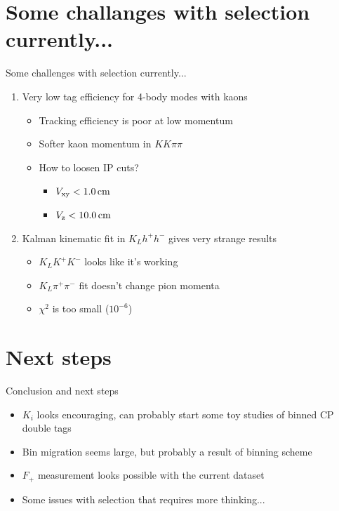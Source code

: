 \documentclass{beamer}
\begin{document}
\section{Some challanges with selection currently...}
\begin{frame}{Some challenges with selection currently...}
  \begin{enumerate}
    \setlength\itemsep{1.5em}
    \item{Very low tag efficiency for 4-body modes with kaons}
    \begin{itemize}
      \setlength\itemsep{1.0em}
      \item{Tracking efficiency is poor at low momentum}
      \item{Softer kaon momentum in $KK\pi\pi$}
      \item{How to loosen IP cuts?}
      \begin{itemize}
        \item{$V_{\rm xy} < \SI{1.0}{\centi\meter}$}
        \item{$V_{\rm z} < \SI{10.0}{\centi\meter}$}
      \end{itemize}
    \end{itemize}
    \item{Kalman kinematic fit in $K_Lh^+h^-$ gives very strange results}
    \begin{itemize}
      \setlength\itemsep{1.0em}
      \item{$K_LK^+K^-$ looks like it's working}
      \item{$K_L\pi^+\pi^-$ fit doesn't change pion momenta}
      \item{$\chi^2$ is too small ($10^{-6}$)}
    \end{itemize}
  \end{enumerate}
\end{frame}

\section{Next steps}
\begin{frame}{Conclusion and next steps}
  \begin{itemize}
    \setlength\itemsep{1.5em}
    \item{$K_i$ looks encouraging, can probably start some toy studies of binned CP double tags}
    \item{Bin migration seems large, but probably a result of binning scheme}
    \item{$F_+$ measurement looks possible with the current dataset}
    \item{Some issues with selection that requires more thinking...}
  \end{itemize}
\end{frame}
\end{document}
